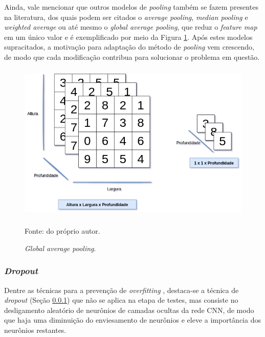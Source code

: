 \begin{sloppypar}
Ainda, vale mencionar que outros modelos de \textit{pooling} também se fazem presentes na literatura, dos quais podem ser citados o \textit{average pooling}, \textit{median pooling} e \textit{weighted average} \cite{Goodfellow2016} ou até mesmo o \textit{global average pooling}, que reduz o \textit{feature map} em um único valor e é exemplificado por meio da Figura \ref{deep:fig:8}. Após estes modelos supracitados, a motivação para adaptação do método de \textit{pooling} vem crescendo, de modo que cada modificação contribua para solucionar o problema em questão.
\end{sloppypar}

\begin{figure}[H]
    \centering
    \caption{\textit{Global average pooling}.}
    \includegraphics[height=3in]{recursos/imagens/deep/global_average_pooling.png}
    \label{deep:fig:8}
    
    \vspace*{1 cm}
     Fonte: do próprio autor.
\end{figure}

\subsubsection{\textit{Dropout}}
\label{deep:dropout}

\begin{sloppypar}
Dentre as técnicas para a prevenção de \textit{overfitting} \cite{Goodfellow2016}, destaca-se a técnica de \textit{dropout} (Seção \ref{deep:dropout}) que não se aplica na etapa de testes, mas consiste no desligamento aleatório de neurônios de camadas ocultas da rede CNN, de modo que haja uma diminuição do enviesamento de neurônios e eleve a importância dos neurônios restantes.
\end{sloppypar}

